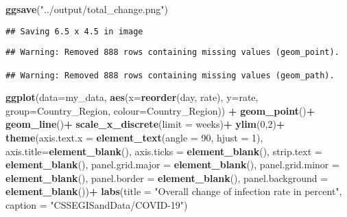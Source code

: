 \documentclass[]{article}
\newenvironment{Shaded}{\begin{snugshade}}{\end{snugshade}}
\newcommand{\DataTypeTok}[1]{\textcolor[rgb]{0.13,0.29,0.53}{#1}}
\newcommand{\DecValTok}[1]{\textcolor[rgb]{0.00,0.00,0.81}{#1}}
\newcommand{\KeywordTok}[1]{\textcolor[rgb]{0.13,0.29,0.53}{\textbf{#1}}}
\newcommand{\NormalTok}[1]{#1}
\newcommand{\OperatorTok}[1]{\textcolor[rgb]{0.81,0.36,0.00}{\textbf{#1}}}
\newcommand{\StringTok}[1]{\textcolor[rgb]{0.31,0.60,0.02}{#1}}
\begin{document}
\begin{Shaded}
\begin{Highlighting}[]
\KeywordTok{ggsave}\NormalTok{(}\StringTok{"../output/total_change.png"}\NormalTok{)}
\end{Highlighting}
\end{Shaded}

\begin{verbatim}
## Saving 6.5 x 4.5 in image
\end{verbatim}

\begin{verbatim}
## Warning: Removed 888 rows containing missing values (geom_point).

## Warning: Removed 888 rows containing missing values (geom_path).
\end{verbatim}

\begin{Shaded}
\begin{Highlighting}[]
\KeywordTok{ggplot}\NormalTok{(}\DataTypeTok{data=}\NormalTok{my_data, }\KeywordTok{aes}\NormalTok{(}\DataTypeTok{x=}\KeywordTok{reorder}\NormalTok{(day, rate), }\DataTypeTok{y=}\NormalTok{rate, }\DataTypeTok{group=}\NormalTok{Country_Region, }\DataTypeTok{colour=}\NormalTok{Country_Region)) }\OperatorTok{+}
\StringTok{  }\KeywordTok{geom_point}\NormalTok{()}\OperatorTok{+}
\StringTok{  }\KeywordTok{geom_line}\NormalTok{()}\OperatorTok{+}
\StringTok{  }\KeywordTok{scale_x_discrete}\NormalTok{(}\DataTypeTok{limit =}\NormalTok{ weeks)}\OperatorTok{+}
\StringTok{  }\KeywordTok{ylim}\NormalTok{(}\DecValTok{0}\NormalTok{,}\DecValTok{2}\NormalTok{)}\OperatorTok{+}
\StringTok{  }\KeywordTok{theme}\NormalTok{(}\DataTypeTok{axis.text.x =} \KeywordTok{element_text}\NormalTok{(}\DataTypeTok{angle =} \DecValTok{90}\NormalTok{, }\DataTypeTok{hjust =} \DecValTok{1}\NormalTok{),}
        \DataTypeTok{axis.title=}\KeywordTok{element_blank}\NormalTok{(),}
        \DataTypeTok{axis.ticks =} \KeywordTok{element_blank}\NormalTok{(),}
        \DataTypeTok{strip.text =} \KeywordTok{element_blank}\NormalTok{(),}
        \DataTypeTok{panel.grid.major =} \KeywordTok{element_blank}\NormalTok{(), }
        \DataTypeTok{panel.grid.minor =} \KeywordTok{element_blank}\NormalTok{(), }
        \DataTypeTok{panel.border =} \KeywordTok{element_blank}\NormalTok{(), }
        \DataTypeTok{panel.background =} \KeywordTok{element_blank}\NormalTok{())}\OperatorTok{+}
\StringTok{ }\KeywordTok{labs}\NormalTok{(}\DataTypeTok{title =}  \StringTok{"Overall change of infection rate in percent"}\NormalTok{,}
       \DataTypeTok{caption =} \StringTok{"CSSEGISandData/COVID-19"}\NormalTok{)}
\end{Highlighting}
\end{Shaded}
\end{document}
